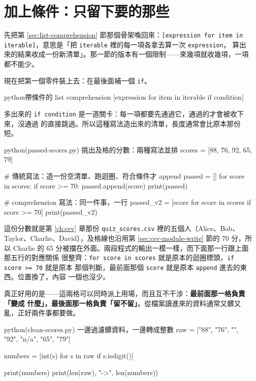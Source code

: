 \section{加上條件：只留下要的那些}
\label{sec:comp-filter}

先把第 \ref{sec:list-comprehension} 節那個骨架喚回來：\texttt{[expression for item in
iterable]}，意思是「把 \texttt{iterable} 裡的每一項各拿去算一次 \texttt{expression}，
算出來的結果收成一份新清單」。那一節的版本有一個限制——來幾項就收幾項，一項都不能少。

現在把第一個零件裝上去：在最後面補一個 \texttt{if}。

\begin{code}{python}{帶條件的 list comprehension}
[expression for item in iterable if condition]
\end{code}

多出來的 \texttt{if condition} 是一道關卡：每一項都要先通過它，通過的才會被收下來，沒通過
的直接跳過。所以這種寫法造出來的清單，長度通常會比原本那份短。

\begin{example}{python}{(passed-scores.py) 挑出及格的分數：兩種寫法並排}
scores = [88, 76, 92, 65, 79]

# 傳統寫法：造一份空清單、跑迴圈、符合條件才 append
passed = []
for score in scores:
    if score >= 70:
        passed.append(score)
print(passed)

# comprehension 寫法：同一件事，一行
passed_v2 = [score for score in scores if score >= 70]
print(passed_v2)
\end{example}

\iosample{}{[88, 76, 92, 79] \\{} [88, 76, 92, 79] \\}

這份分數就是第 \ref{ch:csv} 章那份 \texttt{quiz\_scores.csv} 裡的五個人（Alice、Bob、
Taylor、Charlie、David），及格線也沿用第 \ref{sec:csv-module-write} 節的 70 分，所以
Charlie 的 65 分被擋在外面。兩段程式的輸出一模一樣，而下面那一行跟上面那五行的對應關係
很整齊：\texttt{for score in scores} 就是原本的迴圈標頭，\texttt{if score >= 70} 就是原本
那個判斷，最前面那個 \texttt{score} 就是原本 \texttt{append} 進去的東西。位置換了，內容
一個也沒少。

真正好用的是——這兩格可以同時派上用場，而且互不干涉：\textbf{最前面那一格負責「變成
什麼」，最後面那一格負責「留不留」}。從檔案讀進來的資料通常又髒又亂，正好兩件事都要做。

\begin{example}{python}{(clean-scores.py) 一邊過濾髒資料，一邊轉成整數}
raw = ["88", "76", "", "92", "n/a", "65", "79"]

numbers = [int(s) for s in raw if s.isdigit()]

print(numbers)
print(len(raw), "->", len(numbers))
\end{example}

